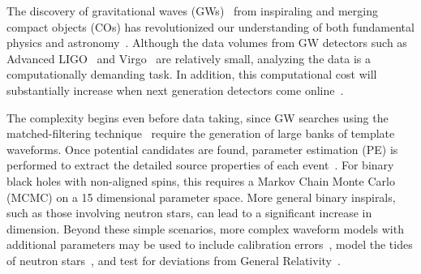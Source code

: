 \documentclass[twocolumn]{aastex631}
\newcommand{\te}[1]{\textbf{\color{pyGreen}(TE: #1)}}
\newcommand{\kw}[1]{{\color{rb4}[KW: #1 ]}}
\newcommand{\AZ}[1]{{\color{Burnt}[AZ: #1]}}
\newcommand{\mi}[1]{\textbf{\color{teal}(MI: #1)}}
\begin{document}
The discovery of gravitational waves (GWs)~\citep{LIGOScientific:2016aoc} from inspiraling and merging compact objects (COs) has revolutionized our understanding of both fundamental physics and astronomy~\citep[e.g.][]{LIGOScientific:2021djp,LIGOScientific:2021sio,LIGOScientific:2021psn}.
Although the data volumes from GW detectors such as Advanced LIGO~\citep{LIGOScientific:2014pky} and Virgo~\citep{VIRGO:2014yos} are relatively small, analyzing the data is a computationally demanding task.
In addition, this computational cost will substantially increase when next generation detectors come online~\citep{Maggiore:2019uih, Reitze:2019iox, Evans:2021gyd}.

The complexity begins even before data taking, since GW searches using the matched-filtering technique~\citep{Owen:1998dk, Owen:1995tm} require the generation of large banks of template waveforms.
Once potential candidates are found, parameter estimation (PE) is performed to extract the detailed source properties of each event~\citep{Christensen:2022bxb, 2020MNRAS.493.3132S, Ashton:2018jfp, Romero-Shaw:2020owr, Veitch:2014wba, Biwer:2018osg, kombine, 10.1093/mnras/stv2422}.
For binary black holes with non-aligned spins, this requires a Markov Chain Monte Carlo (MCMC) on a 15 dimensional parameter space.
More general binary inspirals, such as those involving neutron stars, can lead to a significant increase in dimension.
Beyond these simple scenarios, more complex waveform models with additional parameters may be used to include calibration errors~\citep{Farr:2014,Vitale:2020gvb}, model the tides of neutron stars~\citep{LIGOScientific:2018hze}, and test for deviations from General Relativity~\citep{Arun:2006yw, Agathos:2013upa, Yunes:2016jcc, LIGOScientific:2016lio, LIGOScientific:2020tif, Krishnendu:2021fga}.
\end{document}

